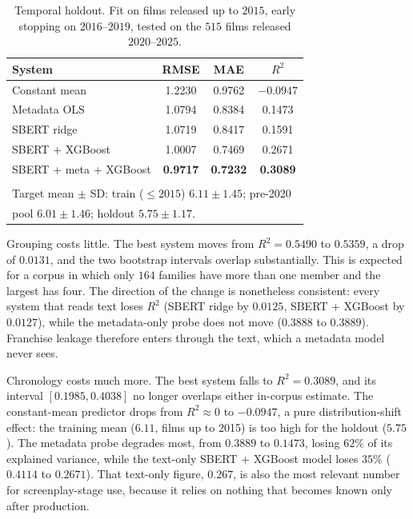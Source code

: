\documentclass[conference,a4paper]{IEEEtran}
\begin{document}
\begin{table}[t]
\caption{Temporal holdout. Fit on films released up to $2015$, early
stopping on $2016$--$2019$, tested on the $515$ films released
$2020$--$2025$.}
\label{tab:temporal}
\centering
\small
\begin{tabular}{lccc}
\toprule
\textbf{System} & RMSE & MAE & $R^{2}$ \\
\midrule
Constant mean   & 1.2230 & 0.9762 & $-0.0947$ \\
Metadata OLS    & 1.0794 & 0.8384 & 0.1473 \\
SBERT ridge     & 1.0719 & 0.8417 & 0.1591 \\
SBERT + XGBoost & 1.0007 & 0.7469 & 0.2671 \\
SBERT + meta + XGBoost & \textbf{0.9717} & \textbf{0.7232} & \textbf{0.3089} \\
\addlinespace[2pt]
\multicolumn{4}{l}{\footnotesize Best system $R^{2}\in[0.1985,0.4038]$;
$\lambda = 6.41\%$.}\\
\multicolumn{4}{l}{\footnotesize Target mean $\pm$ SD: train ($\le 2015$)
$6.11 \pm 1.45$; pre-2020}\\
\multicolumn{4}{l}{\footnotesize pool $6.01 \pm 1.46$; holdout
$5.75 \pm 1.17$.}\\
\bottomrule
\end{tabular}
\end{table}

Grouping costs little. The best system moves from $R^{2} = 0.5490$ to
$0.5359$, a drop of $0.0131$, and the two bootstrap intervals overlap
substantially. This is expected for a corpus in which only $164$
families have more than one member and the largest has four. The
direction of the change is nonetheless consistent: every system that
reads text loses $R^{2}$ (SBERT ridge by $0.0125$, SBERT + XGBoost by
$0.0127$), while the metadata-only probe does not move ($0.3888$ to
$0.3889$). Franchise leakage therefore enters through the text, which a
metadata model never sees.

Chronology costs much more. The best system falls to $R^{2} = 0.3089$,
and its interval $[0.1985, 0.4038]$ no longer overlaps either in-corpus
estimate. The constant-mean predictor drops from $R^{2} \approx 0$ to
$-0.0947$, a pure distribution-shift effect: the training mean ($6.11$,
films up to 2015) is too high for the holdout ($5.75$). The metadata
probe degrades most, from $0.3889$ to $0.1473$, losing $62\%$ of its
explained variance, while the text-only SBERT + XGBoost model loses
$35\%$ ($0.4114$ to $0.2671$). That text-only figure, $0.267$, is also
the most relevant number for screenplay-stage use, because it relies on
nothing that becomes known only after production.
\end{document}
